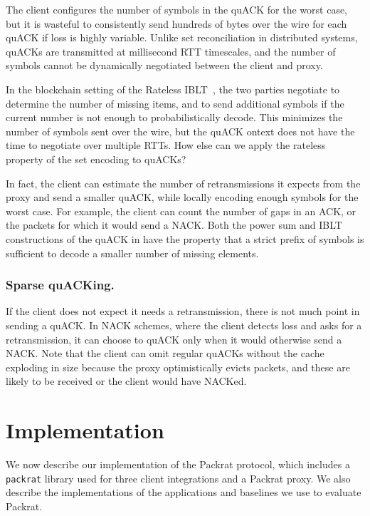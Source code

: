 The client configures the number of symbols in the quACK for the worst case, but
it is wasteful to consistently send hundreds of bytes over the wire for each
quACK if loss is highly variable. Unlike set reconciliation in distributed
systems, quACKs are transmitted at millisecond RTT timescales, and the number
of symbols cannot be dynamically negotiated between the client and proxy.

In the blockchain setting of the Rateless IBLT~\cite{yang2024practical}, the two
parties negotiate to determine the number of missing items, and to send
additional symbols if the current number is not enough to probabilistically
decode. This minimizes the number of symbols sent over the wire, but the
quACK ontext does not have the time to negotiate over multiple RTTs.
How else can we apply the rateless property of the set encoding to quACKs?

In fact, the client can estimate the number of retransmissions it expects from
the proxy and send a smaller quACK, while locally encoding enough symbols for
the worst case. For example, the client can count the number of gaps in an ACK,
or the packets for which it would send a NACK. Both the power sum and IBLT
constructions of the quACK in  have the property
that a strict prefix of symbols is sufficient to decode a smaller number of
missing elements.

\subsubsection{Sparse quACKing.}
\label{sec:packrat:receiver:sparse}

If the client does not expect it needs a retransmission, there is not much point
in sending a quACK. In NACK schemes, where the client detects loss and asks for
a retransmission, it can choose to quACK only when it would
otherwise send a NACK. Note that the client can omit regular quACKs without the
cache exploding in size because the proxy optimistically evicts packets, and
these are likely to be received or the client would have NACKed.

\section{Implementation}
\label{sec:packrat:implementation}

We now describe our implementation of the Packrat protocol, which includes
a \texttt{packrat} library used for three client integrations
and a Packrat proxy. We also describe the implementations of the
applications and baselines we use to evaluate Packrat.

